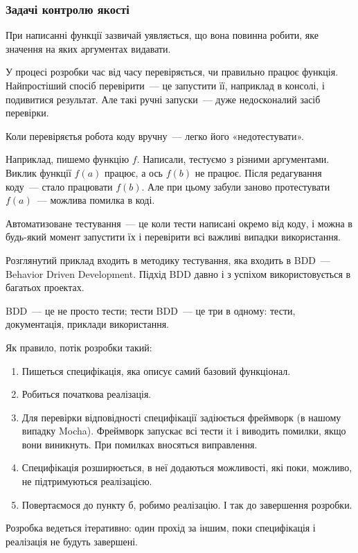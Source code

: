 \subsubsection{Задачі контролю якості}

При написанні функції зазвичай уявляється, що вона повинна робити, яке значення на яких аргументах видавати.

У процесі розробки час від часу перевіряється, чи правильно працює функція. Найпростіший спосіб перевірити~--- це запустити її, наприклад в консолі, і подивитися результат. Але такі ручні запуски~--- дуже недосконалий засіб перевірки.

Коли перевіряєтья робота коду вручну~--- легко його «недотестувати».

Наприклад, пишемо функцію $f$. Написали, тестуємо з різними аргументами. Виклик функції $f(a)$ працює, а ось $f(b)$ не працює. Після редагування коду~--- стало працювати $f(b)$. Але при цьому забули заново протестувати $f(a)$~--- можлива помилка в коді.

Автоматизоване тестування~--- це коли тести написані окремо від коду, і можна в будь-який момент запустити їх і перевірити всі важливі випадки використання.


Розглянутий приклад входить в методику тестування, яка входить в BDD~--- Behavior Driven Development. Підхід BDD давно і з успіхом використовується в багатьох проектах.

BDD~--- це не просто тести; тести BDD~--- це три в одному: тести, документація, приклади використання.

Як правило, потік розробки такий:

\begin{enumerate}
	\item Пишеться специфікація, яка описує самий базовий функціонал.
	\item Робиться початкова реалізація.
	\item Для перевірки відповідності специфікації задіюється фреймворк (в нашому випадку Mocha). Фреймворк запускає всі тести it і виводить помилки, якщо вони виникнуть. При помилках вносяться виправлення.
	\item Специфікація розширюється, в неї додаються можливості, які поки, можливо, не підтримуються реалізацією.
	\item Повертаємося до пункту б, робимо реалізацію. І так до завершення розробки.
\end{enumerate}

Розробка ведеться ітеративно: один прохід за іншим, поки специфікація і реалізація не будуть завершені.
